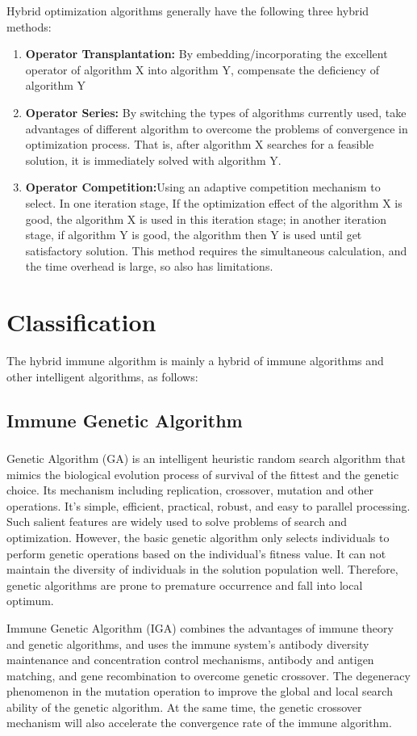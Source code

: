 \documentclass[11pt,a4paper,oldfontcommands]{memoir}
\newcommand{\upcite}[1]{\textsuperscript{\textsuperscript{\cite{#1}}}}
\begin{document}
Hybrid optimization algorithms generally have the following three hybrid methods:
\begin{enumerate}[(1)]
\item{\textbf{Operator Transplantation:} By embedding/incorporating the excellent operator of algorithm X into algorithm Y, compensate the deficiency of algorithm Y}
\item{\textbf{Operator Series:} By switching the types of algorithms currently used, take advantages of different algorithm to overcome the problems of convergence in optimization process. That is, after algorithm X searches for a feasible solution, it is immediately solved with algorithm Y.}
\item{\textbf{Operator Competition:}Using an adaptive competition mechanism to select. In one iteration stage, If the optimization effect of the algorithm X is good, the algorithm X is used in this iteration stage; in another iteration stage, if algorithm Y is good, the algorithm then Y is used until get satisfactory solution. This method requires the simultaneous calculation, and the time overhead is large, so also has limitations.}
\end{enumerate}

\section{Classification}
The hybrid immune algorithm is mainly a hybrid of immune algorithms and other intelligent algorithms, as follows: 

\subsection{Immune Genetic Algorithm}
Genetic Algorithm (GA)\upcite{Holland.1992} is an intelligent heuristic random search algorithm that mimics the biological evolution process of survival of the fittest and the genetic choice. Its mechanism including replication, crossover, mutation and other operations. It’s simple, efficient, practical, robust, and easy to parallel processing. Such salient features are widely used to solve problems of search and optimization. However, the basic genetic algorithm only selects individuals to perform genetic operations based on the individual's fitness value. It can not maintain the diversity of individuals in the solution population well. Therefore, genetic algorithms are prone to premature occurrence and fall into local optimum.

Immune Genetic Algorithm (IGA) combines the advantages of immune theory and genetic algorithms, and uses the immune system's antibody diversity maintenance and concentration control mechanisms, antibody and antigen matching, and gene recombination to overcome genetic crossover. The degeneracy phenomenon in the mutation operation to improve the global and local search ability of the genetic algorithm. At the same time, the genetic crossover mechanism will also accelerate the convergence rate of the immune algorithm.
\end{document}
